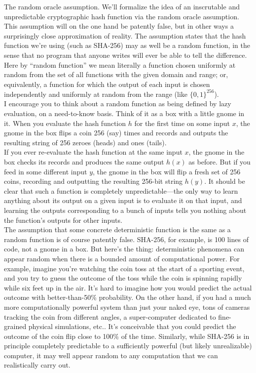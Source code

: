 \noindent
The random oracle assumption. We’ll formalize the idea of an inscrutable and unpredictable cryptographic hash function via the random oracle assumption. This assumption
will on the one hand be patently false, but in other ways a surprisingly close approximation
of reality. The assumption states that the hash function we’re using (such as SHA-256)
may as well be a random function, in the sense that no program that anyone writes will
ever be able to tell the difference. Here by “random function” we mean literally a function
chosen uniformly at random from the set of all functions with the given domain and range;
or, equivalently, a function for which the output of each input is chosen independently and
uniformly at random from the range (like $\{0, 1\}^{256}$).\\
I encourage you to think about a random function as being defined by lazy evaluation,
on a need-to-know basis. Think of it as a box with a little gnome in it. When you evaluate
the hash function $h$ for the first time on some input $x$, the gnome in the box flips a coin
256 (say) times and records and outputs the resulting string of 256 zeroes (heads) and ones
(tails).\\

If you ever re-evaluate the hash function at the same input $x$, the gnome in the box
checks its records and produces the same output $h(x)$ as before. But if you feed in some
different input $y$, the gnome in the box will flip a fresh set of 256 coins, recording and
outputting the resulting 256-bit string $h(y)$. It should be clear that such a function is
completely unpredictable—the only way to learn anything about its output on a given input
is to evaluate it on that input, and learning the outputs corresponding to a bunch
of inputs tells you nothing about the function’s outputs for other inputs.\\
The assumption that some concrete deterministic function is the same as a random
function is of course patently false. SHA-256, for example, is 100 lines of code, not a gnome
in a box. But here’s the thing: deterministic phenomena can appear random when there is
a bounded amount of computational power. For example, imagine you’re watching the coin
toss at the start of a sporting event, and you try to guess the outcome of the toss while the
coin is spinning rapidly while six feet up in the air. It’s hard to imagine how you would
predict the actual outcome with better-than-50\% probability. On the other hand, if you
had a much more computationally powerful system than just your naked eye, tons of cameras tracking the coin from different angles, a super-computer dedicated to fine-grained
physical simulations, etc.. It’s conceivable that you could predict the outcome of the coin
flip close to 100\% of the time. Similarly, while SHA-256 is in principle completely predictable
to a sufficiently powerful (but likely unrealizable) computer, it may well appear random to
any computation that we can realistically carry out.\\


